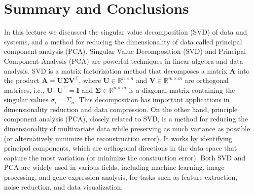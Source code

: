 \documentclass{article}[11pt]
\begin{document}
\section{Summary and Conclusions}
In this lecture we discussed the singular value decomposition (SVD) of data and systems, and a method for reducing the dimensionality of data called principal component analysis (PCA).
Singular Value Decomposition (SVD) and Principal Component Analysis (PCA) are powerful techniques in linear algebra and data analysis. 
SVD is a matrix factorization method that decomposes a matrix $\mathbf{A}$ into the product $\mathbf{A} = \mathbf{U}\mathbf{\Sigma}\mathbf{V}^{\top}$, where
$\mathbf{U}\in\mathbb{R}^{n\times{n}}$ and $\mathbf{V}\in\mathbb{R}^{m\times{m}}$ are orthogonal matrices, i.e., $\mathbf{U}\cdot\mathbf{U}^{\top} = \mathbf{I}$ and $\mathbf{\Sigma}\in\mathbb{R}^{n\times{m}}$ 
is a diagonal matrix containing the singular values $\sigma_{i}=\Sigma_{ii}$.
This decomposition has important applications in dimensionality reduction and data compression. 
On the other hand, principle component analysis (PCA), closely related to SVD, 
is a method for reducing the dimensionality of multivariate data while preserving as much variance as possible (or alternatively minimize the reconstruction error). 
It works by identifying principal components, which are orthogonal directions in the data space that capture the most variation (or minimize the construction error). 
Both SVD and PCA are widely used in various fields, including machine learning, image processing, and gene expression analysis, 
for tasks such as feature extraction, noise reduction, and data visualization.


\end{document}

